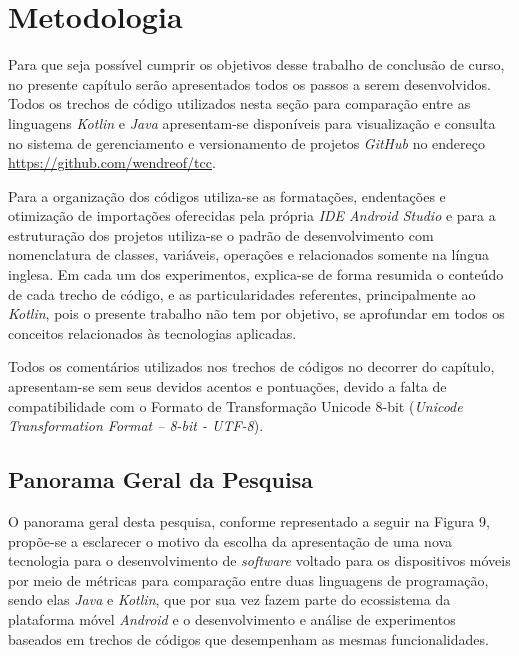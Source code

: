 \chapter{Metodologia}
\label{cap:03}

Para que seja possível cumprir os objetivos desse trabalho de conclusão de curso, no presente capítulo serão apresentados todos os passos a serem desenvolvidos. Todos os trechos de código utilizados nesta seção para comparação entre as linguagens \textit{Kotlin} e \textit{Java} apresentam-se disponíveis para visualização e consulta no sistema de gerenciamento e versionamento de projetos \textit{GitHub} no endereço \url{https://github.com/wendreof/tcc}.

Para a organização dos códigos utiliza-se as formatações, endentações e otimização de importações oferecidas pela própria \textit{IDE Android Studio} e para a estruturação dos projetos utiliza-se o padrão de desenvolvimento com nomenclatura de classes, variáveis, operações e relacionados somente na língua inglesa. Em cada um dos experimentos, explica-se de forma resumida o conteúdo de cada trecho de código, e as particularidades referentes, principalmente ao \textit{Kotlin}, pois o presente trabalho não tem por objetivo, se aprofundar em todos os conceitos relacionados às tecnologias aplicadas.

Todos os comentários utilizados nos trechos de códigos no decorrer do capítulo, apresentam-se sem seus devidos acentos e pontuações, devido a falta de compatibilidade com o Formato de Transformação Unicode 8-bit (\textit{Unicode Transformation Format – 8-bit - UTF-8}).

\section{Panorama Geral da Pesquisa}

O panorama geral desta pesquisa, conforme representado a seguir na Figura 9, propõe-se a esclarecer o motivo da escolha da apresentação de uma nova tecnologia para o desenvolvimento de \textit{software} voltado para os dispositivos móveis por meio de métricas para comparação entre duas linguagens de programação, sendo elas \textit{Java} e \textit{Kotlin}, que por sua vez fazem parte do ecossistema da plataforma móvel \textit{Android} e o desenvolvimento e análise de experimentos baseados em trechos de códigos que desempenham as mesmas funcionalidades.

